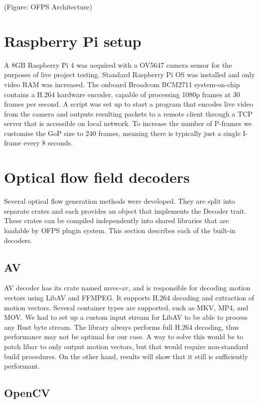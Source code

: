 \documentclass[11pt,english]{report}
\begin{document}
(Figure: OFPS Architecture)

\section{Raspberry Pi setup}

A 8GB Raspberry Pi 4 was acquired with a OV5647 camera sensor for the purposes of live project testing. Standard Raspberry Pi OS was installed and only video RAM was increased. The onboard Broadcom BCM2711 system-on-chip contains a H.264 hardware encoder, capable of processing 1080p frames at 30 frames per second. A script was set up to start a program that encodes live video from the camera and outputs resulting packets to a remote client through a TCP server that is accessible on local network. To increase the number of P-frames we customise the GoP size to 240 frames, meaning there is typically just a single I-frame every 8 seconds.

\section{Optical flow field decoders}

Several optical flow generation methods were developed. They are split into separate crates and each provides an object that implements the Decoder trait. These crates can be compiled independently into shared libraries that are loadable by OFPS plugin system. This section describes each of the built-in decoders.

\subsection{AV}

AV decoder has its crate named mvec-av, and is responsible for decoding motion vectors using LibAV and FFMPEG. It supports H.264 decoding and extraction of motion vectors. Several container types are supported, such as MKV, MP4, and MOV. We had to set up a custom input stream for LibAV to be able to process any Rust byte stream. The library always performs full H.264 decoding, thus performance may not be optimal for our case. A way to solve this would be to patch libav to only output motion vectors\cite{libav-patch}, but that would require non-standard build procedures. On the other hand, results will show that it still is sufficiently performant.

\subsection{OpenCV}
\end{document}
